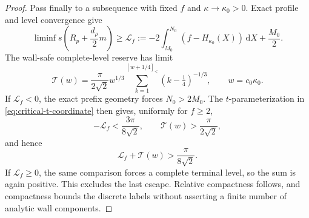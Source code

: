 \documentclass[11pt]{article}
\theoremstyle{remark}
\newcommand{\sbr}[1]{[#1]_{<}}
\newcommand{\dd}{\,\mathrm d}
\begin{document}
\begin{proof}
Pass finally to a subsequence with fixed $f$ and
$\kappa\to\kappa_0>0$.  Exact profile and level convergence give
\[
 \liminf s\left(R_p+\frac{d_\rho}{2}m\right)
 \geq\mathcal L_f:=-2\int_{M_0}^{N_0}
 (f-H_{\kappa_0}(X))\dd X+\frac{M_0}{2}.
\]
The wall-safe complete-level reserve has limit
\[
 \mathcal T(w)=\frac\pi{2\sqrt2}w^{1/3}
 \sum_{k=1}^{\sbr{w+1/4}}(k-\tfrac14)^{-1/3},
 \qquad w=c_0\kappa_0.
\]
If $\mathcal L_f<0$, the exact prefix geometry forces $N_0>2M_0$.
The $t$-parameterization in
\eqref{eq:critical-t-coordinate} then gives, uniformly for $f\geq2$,
\[
 -\mathcal L_f<\frac{3\pi}{8\sqrt2},
 \qquad \mathcal T(w)>\frac\pi{2\sqrt2},
\]
and hence
\begin{equation}
 \mathcal L_f+\mathcal T(w)>\frac\pi{8\sqrt2}.
 \label{eq:uniform-high-floor-critical-gap}
\end{equation}
If $\mathcal L_f\geq0$, the same comparison forces a complete terminal
level, so the sum is again positive.  This excludes the last escape.
Relative compactness follows, and compactness bounds the discrete labels
without asserting a finite number of analytic wall components.
\end{proof}
\end{document}
